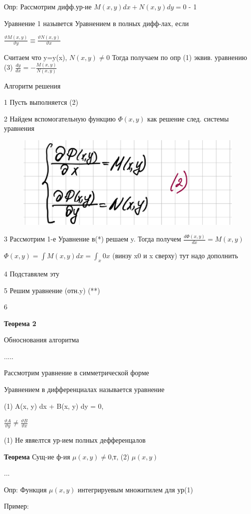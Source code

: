\documentclass{article}
\begin{document}
Опр: Рассмотрим дифф.ур-ие
$M(x,y)dx+N(x,y)dy=0$ - 1

Уравнение 1 назывется Уравнением в полных дифф-лах, если 

$\frac{\vartheta M(x,y)}{\vartheta y} \equiv \frac{\vartheta N(x,y)}{\vartheta x}$

Считаем что y=y(x), $ N(x,y) \neq 0 $
Тогда получаем по опр (1) эквив. уравнению
(3) $\frac{dy}{dx} = - \frac{M(x,y)}{N(x,y)}$

Алгоритм решения 

1 Пусть выполняется (2)

2 Найдем вспомогательную функцию $\Phi(x,y)$
как решение след. системы уравнения

\begin{figure}[H]
    \centering
    \includegraphics[width=0.25\linewidth]{Снимок экрана 2025-02-21 103834.png}
\end{figure}

3 Рассмотрим 1-е Уравнение в(*) решаем y. 
Тогда получем $\frac{d \Phi(x,y)}{dx} = M(x,y)$

$\Phi(x,y) = \int M(x,y)dx = \int_x0 x$ (винзу x0 и x сверху)
тут надо дополнить

4 Подставялем эту

5 Решим уравнение (отн.y)
(**) 

6


\textbf{Теорема 2}

Обноснования алгоритма

.....


Рассмотрим уравнение в симметрической форме

Уравнением в дифференциалах называется
уравнение

(1) A(x, y) dx + B(x, y) dy = 0,

$\frac{\vartheta A}{\vartheta y} \neq \frac{\vartheta B}{\vartheta x} $

(1) Не явяелтся ур-ием полных дефференцалов

\textbf{Теорема} Сущ-ие ф-ия $\mu(x,y)\neq 0$,т, 
(2) $\mu(x,y)   $

...



Опр: Функция $\mu(x,y)$ интегрируевым множитилем для ур(1)

Пример:
\end{document}
